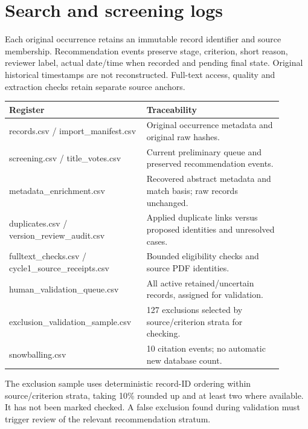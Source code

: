 \documentclass[12pt,a4paper]{article}
\begin{document}
\section{Search and screening logs}
Each original occurrence retains an immutable record identifier and source membership. Recommendation events preserve stage, criterion, short reason, reviewer label, actual date/\allowbreak{}time when recorded and pending final state. Original historical timestamps are not reconstructed. Full-text access, quality and extraction checks retain separate source anchors.


\begin{longtable}{p{0.43\linewidth}p{0.47\linewidth}}
\toprule
Register & Traceability\\\midrule
\endhead
records.csv /\allowbreak{} import\_manifest.csv & Original occurrence metadata and original raw hashes.\\
screening.csv /\allowbreak{} title\_votes.csv & Current preliminary queue and preserved recommendation events.\\
metadata\_enrichment.csv & Recovered abstract metadata and match basis; raw records unchanged.\\
duplicates.csv /\allowbreak{} version\_review\_audit.csv & Applied duplicate links versus proposed identities and unresolved cases.\\
fulltext\_checks.csv /\allowbreak{} cycle1\_source\_receipts.csv & Bounded eligibility checks and source PDF identities.\\
human\_validation\_queue.csv & All active retained/\allowbreak{}uncertain records, assigned for validation.\\
exclusion\_validation\_sample.csv & 127 exclusions selected by source/\allowbreak{}criterion strata for checking.\\
snowballing.csv & 10 citation events; no automatic new database count.\\
\bottomrule
\end{longtable}

The exclusion sample uses deterministic record-ID ordering within source/\allowbreak{}criterion strata, taking 10\% rounded up and at least two where available. It has not been marked checked. A false exclusion found during validation must trigger review of the relevant recommendation stratum.
\end{document}

